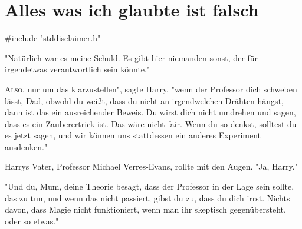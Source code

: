 \chapter{Alles was ich glaubte ist falsch}

\begin{chapterOpeningAuthorNote}
\#include "stddisclaimer.h"
\end{chapterOpeningAuthorNote}


\begin{chapterOpeningQuote}
"Natürlich war es meine Schuld. Es gibt hier niemanden sonst, der für irgendetwas verantwortlich sein könnte."
\end{chapterOpeningQuote}

\lettrine[ante="]{A}{lso}, nur um das klarzustellen", sagte Harry, "wenn der Professor dich schweben lässt, Dad, obwohl du weißt, dass du nicht an irgendwelchen Drähten hängst, dann ist das ein ausreichender Beweis. Du wirst dich nicht umdrehen und sagen, dass es ein Zauberertrick ist. Das wäre nicht fair. Wenn du so denkst, solltest du es jetzt sagen, und wir können uns stattdessen ein anderes Experiment ausdenken."

Harrys Vater, Professor Michael Verres-Evans, rollte mit den Augen. "Ja, Harry."

"Und du, Mum, deine Theorie besagt, dass der Professor in der Lage sein sollte, das zu tun, und wenn das nicht passiert, gibst du zu, dass du dich irrst. Nichts davon, dass Magie nicht funktioniert, wenn man ihr skeptisch gegenübersteht, oder so etwas."

